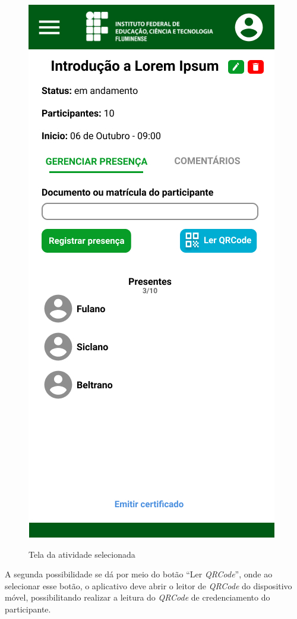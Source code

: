 \begin{figure}[H]
    \centering
    \caption{Tela da atividade selecionada}
    \includegraphics[scale=0.44]{figuras/Gestao/15-Atividade.jpg}
    \label{fig:gestao15}
\end{figure}

A segunda possibilidade se dá por meio do botão “Ler \textit{QRCode}”, onde ao selecionar esse botão, o aplicativo deve abrir o leitor de \textit{QRCode} do dispositivo móvel, possibilitando realizar a leitura do \textit{QRCode} de credenciamento do participante.


